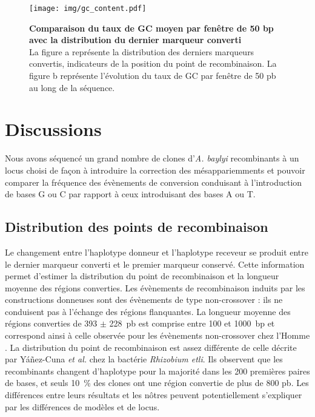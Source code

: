   \null
  \vfill


  \begin{figure}[htbp]
    \centering


    \texttt{[image: img/gc\_content.pdf]}

    \caption[Taux de GC et Taux de Recombinaison]{\textbf{Comparaison du taux de
        GC moyen par fenêtre de 50 bp avec la distribution du dernier marqueur converti} \\
      \rmfamily La figure \textsf{a} représente la distribution des derniers
      marqueurs convertis, indicateurs de la position du point de recombinaison.
      La figure \textsf{b} représente l'évolution du taux de GC par fenêtre de
      50 pb au long de la séquence.
    }
    \label{fig:gctaux}
  \end{figure}

  \vfill
  \thispagestyle{empty}
  \addtocounter{page}{-1}
  \clearpage
  \newpage

\section{Discussions}
\label{sec:discussions}

Nous avons séquencé un grand nombre de clones d'\emph{A. baylyi} recombinants à
un locus choisi de façon à introduire la correction des mésappariemments et
pouvoir comparer la fréquence des évènements de conversion conduisant à
l'introduction de bases G ou C par rapport à ceux introduisant des bases A ou T.

\subsection{Distribution des points de recombinaison}

Le changement entre l'haplotype donneur et l'haplotype receveur se produit entre
le dernier marqueur converti et le premier marqueur conservé. Cette information
permet d'estimer la distribution du point de recombinaison et la longueur
moyenne des régions converties. Les évènements de recombinaison induits par les
constructions donneuses sont des évènements de type non-crossover : ils ne
conduisent pas à l'échange des régions flanquantes\cite{chen_gene_2007}. La
longueur moyenne des régions converties de \num{393} \(\pm\) \num{228}~pb est
comprise entre \num{100} et \num{1000}~bp et correspond ainsi à celle observée
pour les évènements non-crossover chez l'Homme
\cite{williams_non-crossover_2015}. La distribution du point de recombinaison
est assez différente de celle décrite par Yáñez-Cuna \emph{et
  al.}\cite{yanez-cuna_biased_2015} chez la bactérie \emph{Rhizobium etli}. Ils
observent que les recombinants changent d'haplotype pour la majorité dans les
\num{200} premières paires de bases, et seuls \SI{10}{\percent} des clones ont
une région convertie de plus de \num{800} pb. Les différences entre leurs
résultats et les nôtres peuvent potentiellement s'expliquer par les différences
de modèles et de locus.

